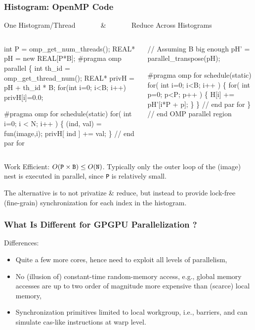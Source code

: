 \documentclass{beamer}
\renewcommand{\emph}[1]{\textcolor{structure}{#1}}
\newcommand{\emp}[1]{\textcolor{DikuRed}{ #1}}
\begin{document}
\begin{frame}[fragile,t]
  \frametitle{Histogram: OpenMP Code}
  
\begin{block}{ One Histogram/Thread \mbox{~~~~~~} \& \mbox{~~~~~~} Reduce Across Histograms }
\begin{columns}
\begin{colorcode}[fontsize=\scriptsize]
int   P  = omp_get_num_threads(); 
REAL* pH = new REAL[P*B]; 
\emph{#pragma omp parallel}
\{ int   th_id = omp_get_thread_num();
  REAL* privH = pH + th_id * B;
  for(int i=0; i<B; i++) privH[i]=0.0;

\emph{#pragma omp for schedule(static)}
  \emp{for( int i=0; i < N; i++ )} \{
    (ind, val) = fun(image,i);
    privH[ ind ] += val;
  \} // \emp{end par for}
\end{colorcode}
\begin{colorcode}[fontsize=\scriptsize]
// Assuming B big enough
pH' = parallel_transpose(pH);

\emph{#pragma omp for schedule(static)}
  \emp{for( int i=0; i<B; i++ )} \{
     for( int p=0; p<P; p++ ) \{
       H[i] += pH'[i*P + p];
     \}
  \} // \emp{end par for}
\} // \emp{end OMP parallel region}
\end{colorcode}
\end{columns}
\end{block} 

\bigskip

Work Efficient: $O({\tt P} \times {\tt B}) \leq O({\tt N})$.
Typically only the outer loop of the (image) nest is executed in parallel,
since {\tt P} is relatively small. 

\bigskip

The alternative is to not privatize \& reduce, but instead to 
provide lock-free (fine-grain) synchronization for each index 
in the histogram. 


\end{frame}


\begin{frame}[fragile,t]
  \frametitle{What Is Different for GPGPU Parallelization ?}
  
Differences:
\begin{itemize}
    \item Quite a few more cores, hence need to exploit all levels of parallelism,\bigskip %
    \item No (illusion of) constant-time random-memory access, e.g.,
            global memory accesses are up to two order of magnitude 
            more expensive than (scarce) local memory,\bigskip
    \item Synchronization primitives limited to local workgroup, i.e., barriers, 
            and can simulate {\sc cas}-like instructions at warp level. 
\end{itemize}


\end{frame}
\end{document}

